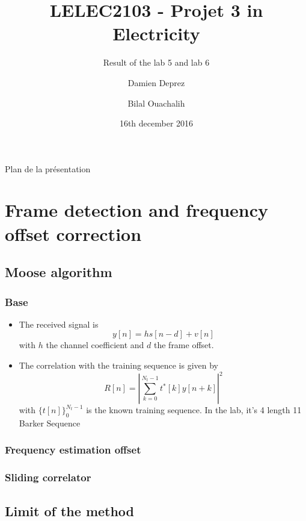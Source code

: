 \documentclass[11pt]{beamer}
\title{LELEC2103 - Projet 3 in Electricity}
\subtitle[\ldots]{Result of the lab 5 and lab 6}
\author[D. Deprez\and B. Ouachalih]{Damien Deprez\and Bilal Ouachalih}
\institute{EPL}
\date{16th december 2016}
\begin{document}
{
	\begin{frame}[noframenumbering]
		\titlepage
	\end{frame}
} 

{
	\begin{frame}[noframenumbering]{Plan de la présentation}
		\tableofcontents
	\end{frame}
}

\section{Frame detection and frequency offset correction}

\subsection{Moose algorithm}

\begin{frame}
\frametitle{Base}
\begin{itemize}
\item The received signal is
\begin{equation}
y[n] = hs[n-d] + v[n]
\end{equation}
with $h$ the channel coefficient and $d$ the frame offset.
\item The correlation with the training sequence is given by
\begin{equation}
R[n] = \left| \sum_{k=0}^{N_t-1} t^*[k]y[n+k] \right|^2
\end{equation}
with $\{t[n]\}_0^{N_t-1}$ is the known training sequence. In the lab, it's 4 length 11 Barker Sequence
\end{itemize}

\end{frame}


\subsubsection{Frequency estimation offset}
\begin{frame}
\frametitle{Sliding correlator}


\end{frame}

\subsection{Limit of the method}
\end{document}

